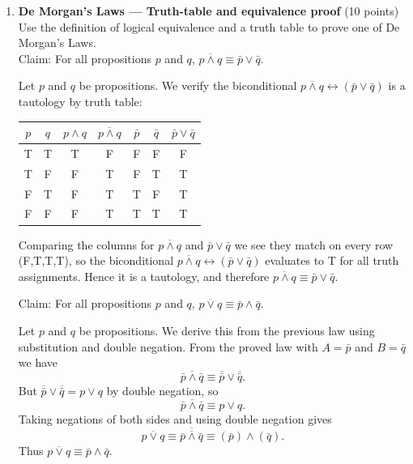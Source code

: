 \begin{enumerate}
  \newpage


  \item \textbf{De Morgan's Laws --- Truth-table and equivalence proof} (10 points)\\
  Use the definition of logical equivalence and a truth table to prove one of De Morgan's Laws.\\

  Claim: For all propositions $p$ and $q$, $\overline{p \wedge q} \equiv \bar{p} \vee \bar{q}$.\\
  \begin{subprove}
    Let $p$ and $q$ be propositions. We verify the biconditional $\overline{p\wedge q}\leftrightarrow(\bar p\vee\bar q)$ is a tautology by truth table:
    \begin{center}
    \begin{tabular}{|c|c|c|c|c|c|c|}
    \hline
    $p$ & $q$ & $p\wedge q$ & $\overline{p\wedge q}$ & $\bar p$ & $\bar q$ & $\bar p\vee\bar q$ \\
    \hline
    T & T & T & F & F & F & F \\
    \hline
    T & F & F & T & F & T & T \\
    \hline
    F & T & F & T & T & F & T \\
    \hline
    F & F & F & T & T & T & T \\
    \hline
    \end{tabular}
    \end{center}
    Comparing the columns for $\overline{p\wedge q}$ and $\bar p\vee\bar q$ we see they match on every row (F,T,T,T), so the biconditional
    $\overline{p\wedge q}\leftrightarrow(\bar p\vee\bar q)$ evaluates to T for all truth assignments. Hence it is a tautology, and therefore
    $\overline{p \wedge q} \equiv \bar{p} \vee \bar{q}$.
  \end{subprove}

  Claim: For all propositions $p$ and $q$, $\overline{p \vee q} \equiv \bar{p} \wedge \bar{q}$.\\
  \begin{subprove}
    Let $p$ and $q$ be propositions. We derive this from the previous law using substitution and double negation.
    From the proved law with $A=\bar p$ and $B=\bar q$ we have
    \[
      \overline{{\bar p}\wedge{\bar q}} \equiv \overline{\bar p}\vee\overline{\bar q}.
    \]
    But $\overline{\bar p}\vee\overline{\bar q}=p\vee q$ by double negation, so
    \[
      \overline{{\bar p}\wedge{\bar q}} \equiv p\vee q.
    \]
    Taking negations of both sides and using double negation gives
    \[
      \overline{p\vee q} \equiv \overline{\overline{{\bar p}\wedge{\bar q}}} \equiv (\bar p)\wedge(\bar q).
    \]
    Thus $\overline{p \vee q} \equiv \bar{p} \wedge \bar{q}$.
  \end{subprove}







\end{enumerate}
